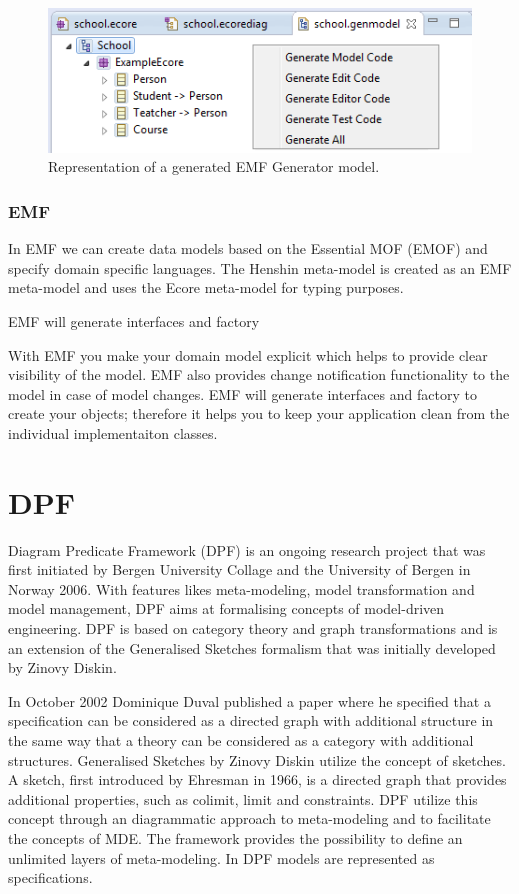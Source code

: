 \begin{figure}[H]
	\centering
	\includegraphics[scale=0.7]{./Figures/EMF_GenModel.png}
	\caption[Representation of an EMF Generator model]
	{Representation of a generated EMF Generator model.}
	\label{fig:EMF_Ecore}
\end{figure}

\subsubsection{EMF}

In EMF we can create data models based on the Essential MOF (EMOF) and specify
domain specific languages. The Henshin meta-model is created as an EMF
meta-model and uses the Ecore meta-model for typing purposes.

EMF will generate interfaces and factory

With EMF you make your domain model explicit which helps to provide clear
visibility of the model. EMF also provides change notification functionality to
the model in case of model changes. EMF will generate interfaces and factory to
create your objects; therefore it helps you to keep your application clean from
the individual implementaiton classes.

\section{DPF}

Diagram Predicate Framework\cite{Rutle_thesis,Rossini_thesis,Lamo2013} (DPF) is
an ongoing research project that was first initiated by Bergen University
Collage and the University of Bergen in Norway 2006. With features likes
meta-modeling, model transformation and model management, DPF aims at
formalising concepts of model-driven engineering. DPF is based on category
theory and graph transformations and is an extension of the Generalised
Sketches\cite{Diskin2003} formalism that was initially developed by Zinovy
Diskin.

In October 2002 Dominique Duval published a paper where he specified that a
specification can be considered as a directed graph with additional structure
in the same way that a theory can be considered as a category with additional
structures\cite{Duval2003}. Generalised Sketches by Zinovy Diskin utilize the
concept of sketches. A sketch, first introduced by Ehresman in 1966, is a
directed graph that provides additional properties, such as colimit, limit and
constraints. DPF utilize this concept through an diagrammatic approach to
meta-modeling and to facilitate the concepts of MDE. The framework provides the
possibility to define an unlimited layers of meta-modeling. In DPF models are
represented as specifications. 

